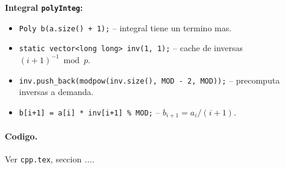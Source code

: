 \textbf{Integral \texttt{polyInteg}:}
\begin{itemize}\setlength\itemsep{0pt}
	\item \verb|Poly b(a.size() + 1);| -- integral tiene un termino mas.
	\item \verb|static vector<long long> inv(1, 1);| -- cache de inversas $(i+1)^{-1} \bmod p$.
	\item \verb|inv.push_back(modpow(inv.size(), MOD - 2, MOD));| -- precomputa inversas a demanda.
	\item \verb|b[i+1] = a[i] * inv[i+1] % MOD;| -- $b_{i+1} = a_i / (i+1)$.
\end{itemize}

\paragraph{Codigo.}
Ver \texttt{cpp.tex}, seccion \textit{...}.
